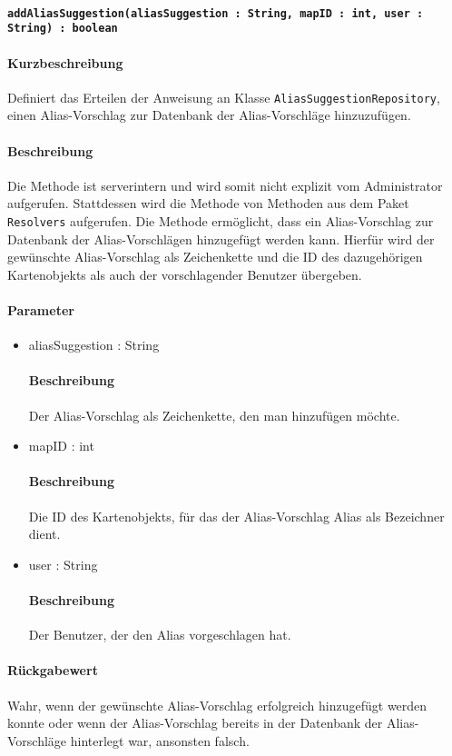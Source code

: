 \paragraph{\texttt{addAliasSuggestion(aliasSuggestion : String, mapID : int, user : String) : boolean}}%
\paragraph*{Kurzbeschreibung}
Definiert das Erteilen der Anweisung an Klasse \texttt{AliasSuggestionRepository}, einen Alias-Vorschlag zur Datenbank der Alias-Vorschläge hinzuzufügen.
\paragraph*{Beschreibung}
Die Methode ist serverintern und wird somit nicht explizit vom Administrator aufgerufen.
Stattdessen wird die Methode von Methoden aus dem Paket \texttt{Resolvers} aufgerufen.
Die Methode ermöglicht, dass ein Alias-Vorschlag zur Datenbank der Alias-Vorschlägen hinzugefügt werden kann.
Hierfür wird der gewünschte Alias-Vorschlag als Zeichenkette und die ID des dazugehörigen Kartenobjekts als auch der vorschlagender Benutzer übergeben.
\paragraph*{Parameter}
\begin{itemize}
    \item aliasSuggestion : String
    		\paragraph*{Beschreibung}
    		Der Alias-Vorschlag als Zeichenkette, den man hinzufügen möchte.
    \item mapID : int
    		\paragraph*{Beschreibung}
    		Die ID des Kartenobjekts, für das der Alias-Vorschlag Alias als Bezeichner dient.
    	\item user : String
    		\paragraph*{Beschreibung}
    		Der Benutzer, der den Alias vorgeschlagen hat.
\end{itemize}
\paragraph*{Rückgabewert}
Wahr, wenn der gewünschte Alias-Vorschlag erfolgreich hinzugefügt werden konnte oder wenn der Alias-Vorschlag bereits in der Datenbank der Alias-Vorschläge hinterlegt war, ansonsten falsch.
